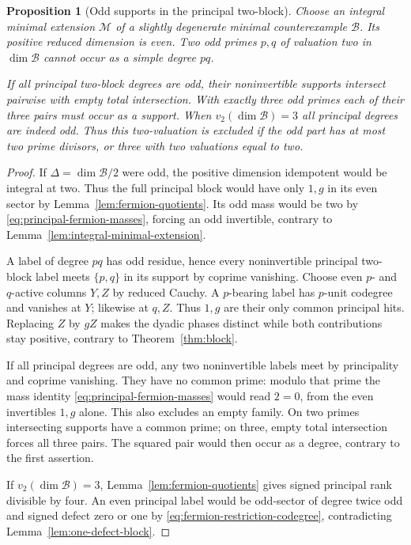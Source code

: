 \documentclass[11pt,a4paper]{article}
\numberwithin{equation}{section}
\newtheorem{proposition}[theorem]{Proposition}
\theoremstyle{remark}
\newcommand{\M}{\mathcal M}
\begin{document}
\begin{proposition}[Odd supports in the principal two-block]\label{lem:principal-fermion-two}
Choose an integral minimal extension $\M$ of a slightly degenerate
minimal counterexample $\mathcal B$. Its positive reduced dimension is even. Two odd primes $p,q$ of
valuation two in $\dim\mathcal B$ cannot occur as a simple degree $pq$.

If all principal two-block degrees are odd, their noninvertible
supports intersect pairwise with empty total intersection. With
exactly three odd primes each of their three pairs must occur as a
support. When $v_2(\dim\mathcal B)=3$ all principal degrees are
indeed odd. Thus this two-valuation is excluded if the odd part has
at most two prime divisors, or three with two valuations equal to two.
\end{proposition}
\begin{proof}
If $\Delta=\dim\mathcal B/2$ were odd, the positive dimension
idempotent would be integral at two. Thus the full principal block
would have only $1,g$ in its even sector by Lemma~\ref{lem:fermion-quotients}.
Its odd mass would be two by \eqref{eq:principal-fermion-masses},
forcing an odd invertible, contrary to Lemma~\ref{lem:integral-minimal-extension}.

A label of degree $pq$ has odd residue, hence every noninvertible
principal two-block label meets $\{p,q\}$ in its support by coprime
vanishing. Choose even $p$- and $q$-active columns $Y,Z$ by reduced
Cauchy. A $p$-bearing label has $p$-unit codegree and vanishes at
$Y$; likewise at $q,Z$. Thus $1,g$ are their only common principal
hits. Replacing $Z$ by $gZ$ makes the dyadic phases distinct while
both contributions stay positive, contrary to Theorem~\ref{thm:block}.

If all principal degrees are odd, any two noninvertible labels
meet by principality and coprime vanishing. They have no common
prime: modulo that prime the mass identity
\eqref{eq:principal-fermion-masses} would read $2=0$, from the
even invertibles $1,g$ alone. This also excludes an empty family.
On two primes intersecting supports have a common prime; on three,
empty total intersection forces all three pairs. The squared pair
would then occur as a degree, contrary to the first assertion.

If $v_2(\dim\mathcal B)=3$, Lemma~\ref{lem:fermion-quotients}
gives signed principal rank divisible by four. An even principal label
would be odd-sector of degree twice odd and signed defect zero or one
by \eqref{eq:fermion-restriction-codegree}, contradicting
Lemma~\ref{lem:one-defect-block}.
\end{proof}
\end{document}
